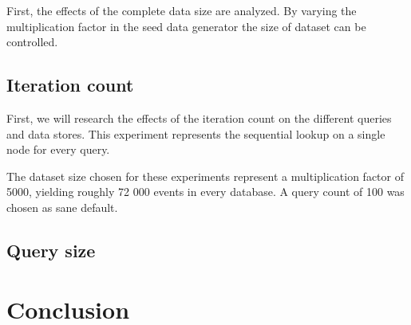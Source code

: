 First, the effects of the complete data size are analyzed.
By varying the multiplication factor in the seed data generator the size of dataset can be controlled.



\subsection{Iteration count}
\label{subsec:iteration-count}

First, we will research the effects of the iteration count on the different queries and data stores.
This experiment represents the sequential lookup on a single node for every query.

The dataset size chosen for these experiments represent a multiplication factor of 5000, yielding roughly 72 000 events in every database.
A query count of 100 was chosen as sane default.



\subsection{Query size}


\section{Conclusion}
\label{sec:comparative-study-conclusion}

